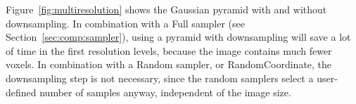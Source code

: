 \documentclass[]{report}
\begin{document}
Figure~\ref{fig:multiresolution} shows the Gaussian pyramid with and
without downsampling. In combination with a Full sampler (see
Section~\ref{sec:comp:sampler}), using a pyramid with downsampling
will save a lot of time in the first resolution levels, because the
image contains much fewer voxels. In combination with a Random
sampler, or RandomCoordinate, the downsampling step is not necessary,
since the random samplers select a user-defined number of samples
anyway, independent of the image size.

\begin{figure}
\centering
{}
 \\

\end{figure}
\end{document}
